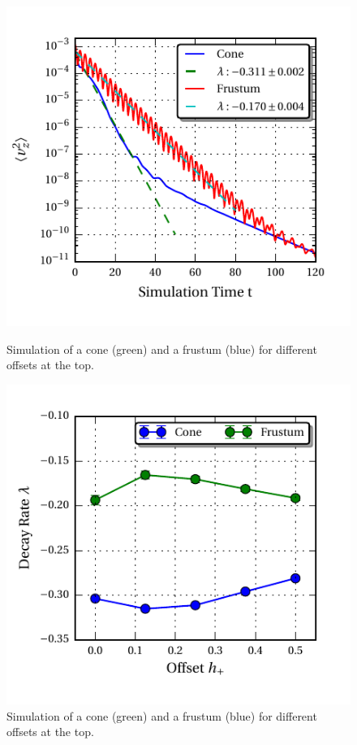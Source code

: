 {\begin{figure}[!b]
\centering
\begin{minipage}{.5\textwidth}
  \centering
  \includegraphics{gfx/cone/final/decay/decay_example.pdf}
  \caption{
      \label{fig:cone:finaldecayexample}
    Simulation of a cone (green) and a frustum (blue) for different offsets at the
    top.
    }
\end{minipage}%
\begin{minipage}{.5\textwidth}
  \centering
  \includegraphics{gfx/cone/final/decay/fit_decay.pdf}
  \caption{
      \label{fig:cone:finaldecayfit}
    Simulation of a cone (green) and a frustum (blue) for different offsets at the
    top.
    }
\end{minipage}
\end{figure}

}
